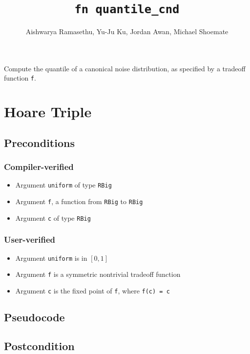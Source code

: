 \documentclass{article}
\title{\texttt{fn quantile\_cnd}}
\author{Aishwarya Ramasethu, Yu-Ju Ku, Jordan Awan, Michael Shoemate}
\begin{document}
\maketitle

\contrib

Compute the quantile of a canonical noise distribution, as specified by a tradeoff function \texttt{f}.

\section{Hoare Triple}

\subsection*{Preconditions}
\subsubsection*{Compiler-verified}
\begin{itemize}
    \item Argument \texttt{uniform} of type \texttt{RBig}
    \item Argument \texttt{f}, a function from \texttt{RBig} to \texttt{RBig}
    \item Argument \texttt{c} of type \texttt{RBig}
\end{itemize}

\subsubsection*{User-verified}
\begin{itemize}
    \item Argument \texttt{uniform} is in $[0, 1]$
    \item Argument \texttt{f} is a symmetric nontrivial tradeoff function
    \item Argument \texttt{c} is the fixed point of \texttt{f}, where \texttt{f(c) = c}
\end{itemize}

\subsection*{Pseudocode}



\subsection*{Postcondition}
\end{document}
